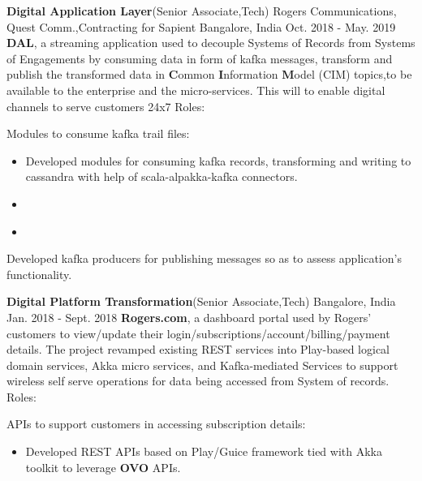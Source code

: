 \begin{cventries}
\experienceentry
    {\textbf{Digital Application Layer}(Senior Associate,Tech)}
    {Rogers Communications, Quest Comm.,Contracting for Sapient}
    {Bangalore, India}
    {Oct. 2018 - May. 2019}
    {\textbf{DAL}, a streaming application used to decouple Systems of Records from Systems of Engagements by consuming data in form of kafka messages, transform and publish the transformed data in \textbf{C}ommon \textbf{I}nformation \textbf{M}odel (CIM) topics,to be available to the enterprise and the micro-services. This will to enable digital channels to serve customers 24x7 }
    {Roles:}
    {
      \begin{cvitems}
        \item {Modules to consume kafka trail files:}
\begin{itemize}
\item Developed modules for consuming kafka records, transforming and writing to cassandra with help of scala-alpakka-kafka connectors.
\end{itemize}
\begin{itemize}
\item 
\end{itemize}
\begin{itemize}
\item 
\end{itemize}
        \item {Developed kafka producers for publishing messages so as to assess application's functionality.}
             \end{cvitems}
    }
\experienceentry
    {\textbf{Digital Platform Transformation}(Senior Associate,Tech)}
    {}
    {Bangalore, India}
    {Jan. 2018 - Sept. 2018}
    {\textbf{Rogers.com}, a dashboard portal used by Rogers' customers to view/update their login/subscriptions/account/billing/payment details. The project revamped existing REST services into Play-based logical domain services, Akka micro services, and Kafka-mediated Services  to support wireless self serve operations for data being accessed from System of records. }
    {Roles:}
    {
      \begin{cvitems}
        \item {APIs to support customers in accessing subscription details:}
\begin{itemize}
\item Developed REST APIs based on Play/Guice framework tied with Akka toolkit to leverage \textbf{OVO} APIs.
\end{itemize}

\end{cvitems}}
\end{cventries}
